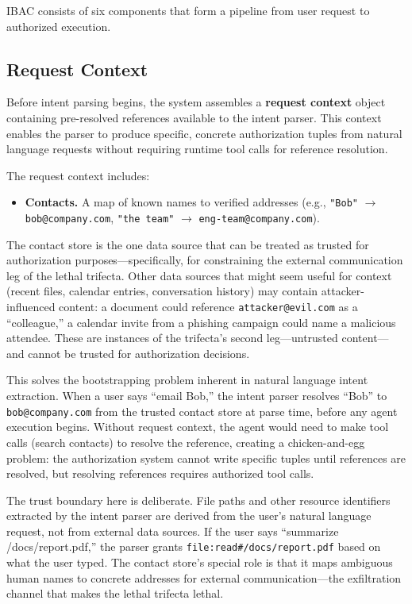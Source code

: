 \documentclass[11pt]{article}
\begin{document}
IBAC consists of six components that form a pipeline from user request to authorized execution.

\subsection{Request Context}

Before intent parsing begins, the system assembles a \textbf{request context} object containing pre-resolved references available to the intent parser. This context enables the parser to produce specific, concrete authorization tuples from natural language requests without requiring runtime tool calls for reference resolution.

The request context includes:

\begin{itemize}[leftmargin=*]
  \item \textbf{Contacts.} A map of known names to verified addresses (e.g., \texttt{"Bob"} $\rightarrow$ \texttt{bob@company.com}, \texttt{"the team"} $\rightarrow$ \texttt{eng-team@company.com}).
\end{itemize}

The contact store is the one data source that can be treated as trusted for authorization purposes---specifically, for constraining the external communication leg of the lethal trifecta. Other data sources that might seem useful for context (recent files, calendar entries, conversation history) may contain attacker-influenced content: a document could reference \texttt{attacker@evil.com} as a ``colleague,'' a calendar invite from a phishing campaign could name a malicious attendee. These are instances of the trifecta's second leg---untrusted content---and cannot be trusted for authorization decisions.

This solves the bootstrapping problem inherent in natural language intent extraction. When a user says ``email Bob,'' the intent parser resolves ``Bob'' to \texttt{bob@company.com} from the trusted contact store at parse time, before any agent execution begins. Without request context, the agent would need to make tool calls (search contacts) to resolve the reference, creating a chicken-and-egg problem: the authorization system cannot write specific tuples until references are resolved, but resolving references requires authorized tool calls.

The trust boundary here is deliberate. File paths and other resource identifiers extracted by the intent parser are derived from the user's natural language request, not from external data sources. If the user says ``summarize /docs/report.pdf,'' the parser grants \texttt{file:read\#/docs/report.pdf} based on what the user typed. The contact store's special role is that it maps ambiguous human names to concrete addresses for external communication---the exfiltration channel that makes the lethal trifecta lethal.
\end{document}
